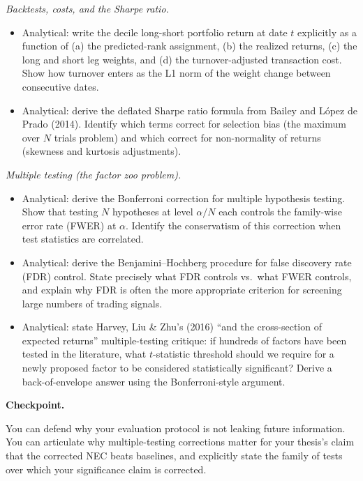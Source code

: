 \emph{Backtests, costs, and the Sharpe ratio.}

\begin{itemize}
\tightlist
\item
  Analytical: write the decile long-short portfolio return at date \(t\)
  explicitly as a function of (a) the predicted-rank assignment, (b) the
  realized returns, (c) the long and short leg weights, and (d) the
  turnover-adjusted transaction cost. Show how turnover enters as the L1
  norm of the weight change between consecutive dates.
\item
  Analytical: derive the deflated Sharpe ratio formula from Bailey and
  López de Prado (2014). Identify which terms correct for selection bias
  (the maximum over \(N\) trials problem) and which correct for
  non-normality of returns (skewness and kurtosis adjustments).
\end{itemize}

\emph{Multiple testing (the factor zoo problem).}

\begin{itemize}
\tightlist
\item
  Analytical: derive the Bonferroni correction for multiple hypothesis
  testing. Show that testing \(N\) hypotheses at level \(\alpha/N\) each
  controls the family-wise error rate (FWER) at \(\alpha\). Identify the
  conservatism of this correction when test statistics are correlated.
\item
  Analytical: derive the Benjamini--Hochberg procedure for false
  discovery rate (FDR) control. State precisely what FDR controls
  vs.~what FWER controls, and explain why FDR is often the more
  appropriate criterion for screening large numbers of trading signals.
\item
  Analytical: state Harvey, Liu \& Zhu's (2016) ``and the cross-section
  of expected returns'' multiple-testing critique: if hundreds of
  factors have been tested in the literature, what \(t\)-statistic
  threshold should we require for a newly proposed factor to be
  considered statistically significant? Derive a back-of-envelope answer
  using the Bonferroni-style argument.
\end{itemize}

\textbf{Checkpoint.}

You can defend why your evaluation protocol is not leaking future
information. You can articulate why multiple-testing corrections matter
for your thesis's claim that the corrected NEC beats baselines, and
explicitly state the family of tests over which your significance claim
is corrected.

